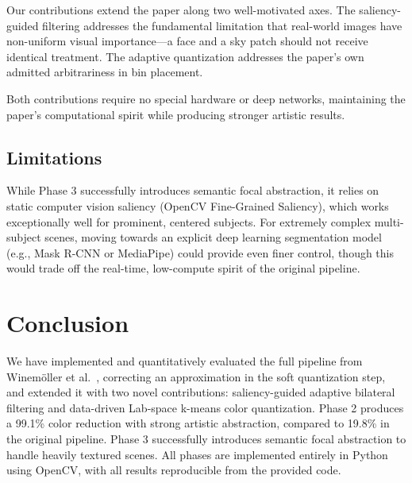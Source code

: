 \documentclass[conference]{IEEEtran}
\begin{document}
Our contributions extend the paper along two well-motivated axes. The saliency-guided filtering addresses the fundamental limitation that real-world images have non-uniform visual importance—a face and a sky patch should not receive identical treatment. The adaptive quantization addresses the paper's own admitted arbitrariness in bin placement.

Both contributions require no special hardware or deep networks, maintaining the paper's computational spirit while producing stronger artistic results.

\subsection{Limitations}

While Phase 3 successfully introduces semantic focal abstraction, it relies on static computer vision saliency (OpenCV Fine-Grained Saliency), which works exceptionally well for prominent, centered subjects. For extremely complex multi-subject scenes, moving towards an explicit deep learning segmentation model (e.g., Mask R-CNN or MediaPipe) could provide even finer control, though this would trade off the real-time, low-compute spirit of the original pipeline.

\section{Conclusion}

We have implemented and quantitatively evaluated the full pipeline from Winemöller et al.~\cite{winemoller2006}, correcting an approximation in the soft quantization step, and extended it with two novel contributions: saliency-guided adaptive bilateral filtering and data-driven Lab-space k-means color quantization. Phase 2 produces a 99.1\% color reduction with strong artistic abstraction, compared to 19.8\% in the original pipeline. Phase 3 successfully introduces semantic focal abstraction to handle heavily textured scenes. All phases are implemented entirely in Python using OpenCV, with all results reproducible from the provided code.
\end{document}
